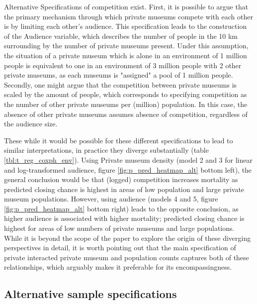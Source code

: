 \documentclass[12pt]{article}
\begin{document}
Alternative Specifications of competition exist.
First, it is possible to argue that the primary mechanism through which private museums compete with each other is by limiting each other's audience.
This specification leads to the construction of the Audience variable, which describes the number of people in the 10 km surrounding by the number of private museums present.
Under this assumption, the situation of a private museum which is alone in an environment of 1 million people is equivalent to one in an environment of 3 million people with 2 other private museums, as each museums is "assigned" a pool of 1 million people.
Secondly, one might argue that the competition between private museums is scaled by the amount of people, which corresponds to specifying competition as the number of other private museums per (million) population.
In this case, the absence of other private museums assumes absence of competition, regardless of the audience size.


These while it would be possible for these different specifications to lead to similar interpretations, in practice they diverge substantially (table \ref{tbl:t_reg_coxph_env}).
Using Private museum density (model 2 and 3 for linear and log-transformed audience, figure \ref{fig:p_pred_heatmap_alt} bottom left), the general conclusion would be that (logged) competition increases mortality as predicted closing chance is highest in areas of low population and large private museum populations.
However, using audience (models 4 and 5, figure \ref{fig:p_pred_heatmap_alt} bottom right) leads to the opposite conclusion, as higher audience is associated with higher mortality; predicted closing chance is highest for areas of low numbers of private museums and large populations.
While it is beyond the scope of the paper to explore the origin of these diverging perspectives in detail, it is worth pointing out that the main specification of private interacted private museum and population counts captures both of these relationships, which arguably makes it preferable for its encompassingness.
\subsection*{Alternative sample specifications}
\end{document}
